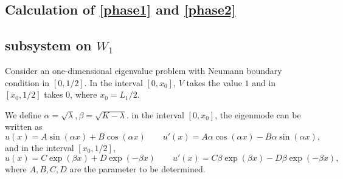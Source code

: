 \documentclass[a4paper,11pt]{article}
\begin{document}
\begin{appendices}
\section{Calculation of \eqref{phase1} and \eqref{phase2}}\label{AppendixC}

\subsection{subsystem on $W_1$}

Consider an one-dimensional eigenvalue problem with Neumann boundary condition in $[0, 1/2]$. In the interval $[0, x_0]$, $V$ takes the value $1$ and in $[x_0, 1/2]$ takes $0$, where $x_0 = L_1/2$.

We define $\alpha = \sqrt{\lambda}, \beta = \sqrt{K - \lambda}$. in the interval $[0, x_0]$, the eigenmode can be written as
\begin{equation*}
u(x) = A \sin(\alpha x) + B \cos(\alpha x) \qquad u'(x) = A \alpha \cos(\alpha x) - B \alpha \sin(\alpha x),
\end{equation*}
and in the interval $[x_0, 1/2]$,
\begin{equation*}
u(x) = C \exp(\beta x) + D \exp(-\beta x) \qquad u'(x) = C \beta \exp(\beta x) - D \beta \exp(-\beta x),
\end{equation*}
where $A ,B, C, D$ are the parameter to be determined.


\end{appendices}
\end{document}
